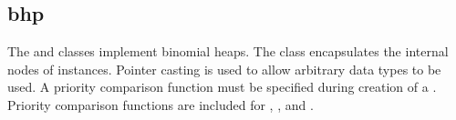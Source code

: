 %
%
%
%
%              

\subsection{bhp}
\label{bhp}
The  and  classes implement binomial heaps.  The
 class encapsulates the internal nodes of 
instances.  Pointer casting is used to allow arbitrary data types to be used.  A
priority comparison function must be specified during creation of a
.  Priority comparison functions are included for
, , and .


